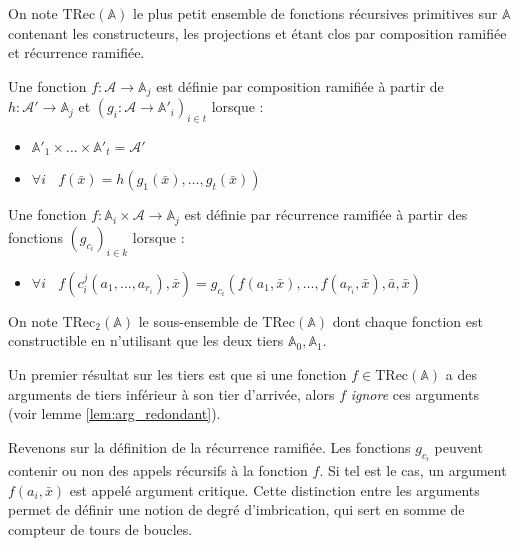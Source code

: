 \documentclass{report}
\newcommand{\bbA}{\mathbb{A}}
\newcommand{\TRec}[1]{\text{TRec}\left(\mathbb{#1}\right)}
\newcommand{\TRecd}[1]{\text{TRec}_{2}\left(\mathbb{#1}\right)}
\begin{document}
			\begin{definition} 
				\label{def:TRecA}
				On note $\TRec{A}$ le plus petit ensemble de fonctions récursives primitives sur $\bbA$ contenant les constructeurs, les projections et étant clos par composition ramifiée et récurrence ramifiée.
				
				\espace
				
				\hspace{0.1\linewidth}\parbox{0.9\linewidth}{
					\small
					Une fonction $f: \mathcal{A} \to \bbA_j$ est définie par composition ramifiée à partir de $h: \mathcal{A}' \to \bbA_j$ et $\left(g_i : \mathcal{A} \to \bbA'_i\right)_{i\in t}$ lorsque :
					
					\begin{itemize}
						\item	$\bbA'_1 \times \dots \times \bbA'_t = \mathcal{A}'$
						
						\item 	$\forall i \:\:\:\:
						f\left( \bar{x} \right) = h\left( g_1\left( \bar{x}\right), \dots,  g_t\left( \bar{x} \right) \right)
						$
					\end{itemize}
				}
				
				\espace
				
				\hspace{0.1\linewidth}\parbox{0.9\linewidth}{
					\small
					Une fonction $f: \bbA_i \times \mathcal{A} \to \bbA_j$ est définie par récurrence ramifiée à partir des fonctions $\left( g_{c_i} \right)_{i\in k}$ lorsque :
					
					\begin{itemize}
						\item 	$\forall i \:\:\:\:
						f(c_i^j(a_1, \dots, a_{r_i}), \bar{x}) 
						= g_{c_i}\left( f(a_1, \bar{x}), \dots, f(a_{r_i}, \bar{x}), \bar{a}, \bar{x} \right)
						$
					\end{itemize}
				}
				
				\espace
				
				On note $\TRecd{A}$ le sous-ensemble de $\TRec{A}$ dont chaque fonction est constructible en n'utilisant que les deux tiers $\bbA_0, \bbA_1$.
			\end{definition}
			
			Un premier résultat sur les tiers est que si une fonction $f \in \TRec{\bbA}$ a des arguments de tiers inférieur à son tier d'arrivée, alors $f$ \emph{ignore} ces arguments (voir lemme \ref{lem:arg_redondant}).
			
			Revenons sur la définition de la récurrence ramifiée. Les fonctions $g_{c_i}$ peuvent contenir ou non des appels récursifs à la fonction $f$. Si tel est le cas, un argument $f\left( a_i, \bar{x} \right)$ est appelé argument critique. Cette distinction entre les arguments permet de définir une notion de degré d'imbrication, qui sert en somme de compteur de tours de boucles. 
			
\end{document}
